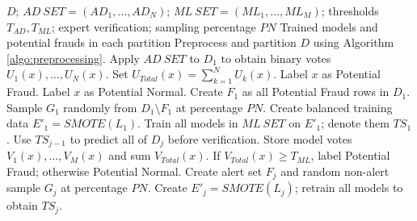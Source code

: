 \begin{algorithm}[htbp]
\footnotesize
\caption{Simple structure of the SAD algorithm}\label{algo:simple}
\begin{algorithmic}[1]
\REQUIRE $D$; $AD\ SET=(AD_1,\ldots,AD_N)$; $ML\ SET=(ML_1,\ldots,ML_M)$;
\STATE \hspace{1em} thresholds $T_{AD},T_{ML}$; expert verification; sampling percentage $PN$
\ENSURE Trained models and potential frauds in each partition
\STATE Preprocess and partition $D$ using Algorithm \ref{algo:preprocessing}.
\STATE Apply $AD\ SET$ to $D_1$ to obtain binary votes $U_1(x),\ldots,U_N(x)$.
\STATE Set $U_{Total}(x)=\sum_{k=1}^{N}U_k(x)$.
\STATE Label $x$ as Potential Fraud.
\ELSE
\STATE Label $x$ as Potential Normal.
\ENDIF
\ENDFOR
\STATE Create $F_1$ as all Potential Fraud rows in $D_1$.
\STATE Sample $G_1$ randomly from $D_1\setminus F_1$ at percentage $PN$.
\STATE {}
\STATE Create balanced training data $E'_1=SMOTE(L_1)$.
\STATE Train all models in $ML\ SET$ on $E'_1$; denote them $TS_1$.
\STATE Use $TS_{j-1}$ to predict all of $D_j$ before verification.
\STATE Store model votes $V_1(x),\ldots,V_M(x)$ and sum $V_{Total}(x)$.
\STATE If $V_{Total}(x)\geq T_{ML}$, label Potential Fraud; otherwise Potential Normal.
\ENDFOR
\STATE Create alert set $F_j$ and random non-alert sample $G_j$ at percentage $PN$.
\STATE {}
\STATE {}
\STATE Create $E'_j=SMOTE(L_j)$; retrain all models to obtain $TS_j$.
\ENDIF
\ENDFOR
\end{algorithmic}
\end{algorithm}
